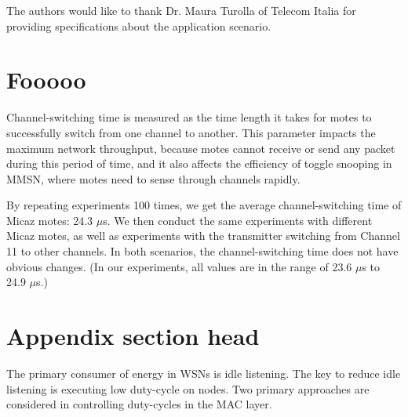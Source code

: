 
\begin{acks}
  The authors would like to thank Dr. Maura Turolla of Telecom
  Italia for providing specifications about the application scenario.
\end{acks}





\elecappendix

\medskip

\section{Fooooo}

Channel-switching time is measured as the time length it takes for
motes to successfully switch from one channel to another. This
parameter impacts the maximum network throughput, because motes
cannot receive or send any packet during this period of time, and it
also affects the efficiency of toggle snooping in MMSN, where motes
need to sense through channels rapidly.

By repeating experiments 100 times, we get the average
channel-switching time of Micaz motes: 24.3 $\mu$s. We then conduct
the same experiments with different Micaz motes, as well as
experiments with the transmitter switching from Channel 11 to other
channels. In both scenarios, the channel-switching time does not have
obvious changes. (In our experiments, all values are in the range of
23.6 $\mu$s to 24.9 $\mu$s.)

\section{Appendix section head}

The primary consumer of energy in WSNs is idle listening. The key to
reduce idle listening is executing low duty-cycle on nodes. Two
primary approaches are considered in controlling duty-cycles in the
MAC layer.


